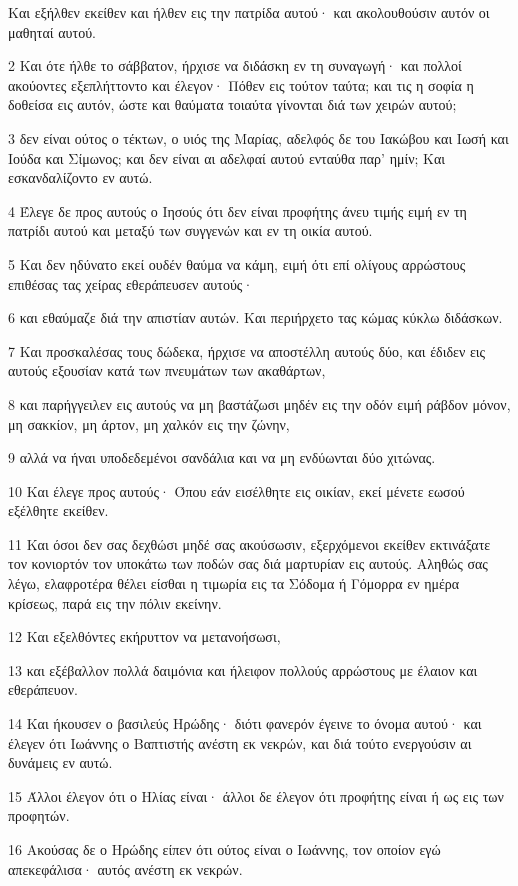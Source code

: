 \par Και εξήλθεν εκείθεν και ήλθεν εις την πατρίδα αυτού· και ακολουθούσιν αυτόν οι μαθηταί αυτού.
\par 2 Και ότε ήλθε το σάββατον, ήρχισε να διδάσκη εν τη συναγωγή· και πολλοί ακούοντες εξεπλήττοντο και έλεγον· Πόθεν εις τούτον ταύτα; και τις η σοφία η δοθείσα εις αυτόν, ώστε και θαύματα τοιαύτα γίνονται διά των χειρών αυτού;
\par 3 δεν είναι ούτος ο τέκτων, ο υιός της Μαρίας, αδελφός δε του Ιακώβου και Ιωσή και Ιούδα και Σίμωνος; και δεν είναι αι αδελφαί αυτού ενταύθα παρ' ημίν; Και εσκανδαλίζοντο εν αυτώ.
\par 4 Έλεγε δε προς αυτούς ο Ιησούς ότι δεν είναι προφήτης άνευ τιμής ειμή εν τη πατρίδι αυτού και μεταξύ των συγγενών και εν τη οικία αυτού.
\par 5 Και δεν ηδύνατο εκεί ουδέν θαύμα να κάμη, ειμή ότι επί ολίγους αρρώστους επιθέσας τας χείρας εθεράπευσεν αυτούς·
\par 6 και εθαύμαζε διά την απιστίαν αυτών. Και περιήρχετο τας κώμας κύκλω διδάσκων.
\par 7 Και προσκαλέσας τους δώδεκα, ήρχισε να αποστέλλη αυτούς δύο, και έδιδεν εις αυτούς εξουσίαν κατά των πνευμάτων των ακαθάρτων,
\par 8 και παρήγγειλεν εις αυτούς να μη βαστάζωσι μηδέν εις την οδόν ειμή ράβδον μόνον, μη σακκίον, μη άρτον, μη χαλκόν εις την ζώνην,
\par 9 αλλά να ήναι υποδεδεμένοι σανδάλια και να μη ενδύωνται δύο χιτώνας.
\par 10 Και έλεγε προς αυτούς· Όπου εάν εισέλθητε εις οικίαν, εκεί μένετε εωσού εξέλθητε εκείθεν.
\par 11 Και όσοι δεν σας δεχθώσι μηδέ σας ακούσωσιν, εξερχόμενοι εκείθεν εκτινάξατε τον κονιορτόν τον υποκάτω των ποδών σας διά μαρτυρίαν εις αυτούς. Αληθώς σας λέγω, ελαφροτέρα θέλει είσθαι η τιμωρία εις τα Σόδομα ή Γόμορρα εν ημέρα κρίσεως, παρά εις την πόλιν εκείνην.
\par 12 Και εξελθόντες εκήρυττον να μετανοήσωσι,
\par 13 και εξέβαλλον πολλά δαιμόνια και ήλειφον πολλούς αρρώστους με έλαιον και εθεράπευον.
\par 14 Και ήκουσεν ο βασιλεύς Ηρώδης· διότι φανερόν έγεινε το όνομα αυτού· και έλεγεν ότι Ιωάννης ο Βαπτιστής ανέστη εκ νεκρών, και διά τούτο ενεργούσιν αι δυνάμεις εν αυτώ.
\par 15 Άλλοι έλεγον ότι ο Ηλίας είναι· άλλοι δε έλεγον ότι προφήτης είναι ή ως εις των προφητών.
\par 16 Ακούσας δε ο Ηρώδης είπεν ότι ούτος είναι ο Ιωάννης, τον οποίον εγώ απεκεφάλισα· αυτός ανέστη εκ νεκρών.
